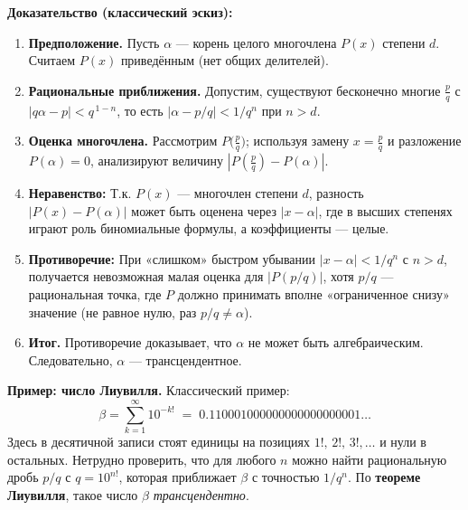 \medskip


\textbf{Доказательство (классический эскиз):}
\begin{enumerate}
  \item \textbf{Предположение.} Пусть $\alpha$ — корень целого многочлена $P(x)$ степени $d$. Считаем $P(x)$ приведённым (нет общих делителей).  
  \item \textbf{Рациональные приближения.} Допустим, существуют бесконечно многие $\frac{p}{q}$ с $|q\alpha - p| < q^{\,1-n}$, то есть $|\alpha - p/q|<1/q^n$ при $n>d$.  
  \item \textbf{Оценка многочлена.}  
    Рассмотрим $P\bigl(\tfrac{p}{q}\bigr)$; используя замену $x=\tfrac{p}{q}$ и разложение $P(\alpha)=0$, анализируют величину $|P(\tfrac{p}{q})-P(\alpha)|$.  
  \item \textbf{Неравенство:}  
    Т.к. $P(x)$ — многочлен степени $d$, разность $|P(x)-P(\alpha)|$ может быть оценена через $|x-\alpha|$, где в высших степенях играют роль биномиальные формулы, а коэффициенты — целые.  
  \item \textbf{Противоречие:}  
    При «слишком» быстром убывании $|x-\alpha| < 1/q^n$ с $n>d$, получается невозможная малая оценка для $|P(p/q)|$, хотя $p/q$ — рациональная точка, где $P$ должно принимать вполне «ограниченное снизу» значение (не равное нулю, раз $p/q\neq \alpha$).  
  \item \textbf{Итог.}  
    Противоречие доказывает, что $\alpha$ не может быть алгебраическим. Следовательно, $\alpha$ — трансцендентное.
\end{enumerate}

\medskip


\textbf{Пример: число Лиувилля.}
Классический пример: 
\[
\beta = \sum_{k=1}^{\infty} 10^{-k!}
\;=\; 0{.}110001000000000000000001\dots
\]
Здесь в десятичной записи стоят единицы на позициях $1!,\,2!,\,3!,\dots$ и нули в остальных. Нетрудно проверить, что для любого $n$ можно найти рациональную дробь $p/q$ с $q=10^{n!}$, которая приближает $\beta$ с точностью $1/q^n$. По \textbf{теореме Лиувилля}, такое число $\beta$ \emph{трансцендентно}.

\medskip

